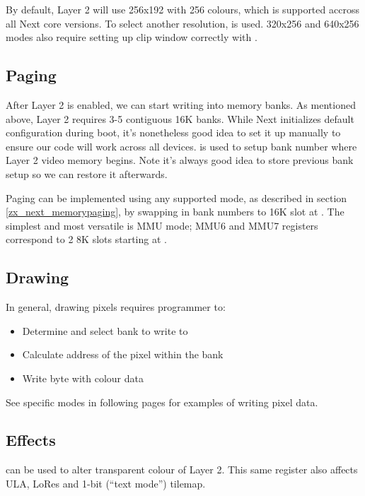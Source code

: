 By default, Layer 2 will use 256x192 with 256 colours, which is supported accross all Next core versions. To select another resolution,  is used. 320x256 and 640x256 modes also require setting up clip window correctly with .


\subsection{Paging}

After Layer 2 is enabled, we can start writing into memory banks. As mentioned above, Layer 2 requires 3-5 contiguous 16K banks. While Next initializes default configuration during boot, it's nonetheless good idea to set it up manually to ensure our code will work across all devices.  is used to setup bank number where Layer 2 video memory begins. Note it's always good idea to store previous bank setup so we can restore it afterwards.

Paging can be implemented using any supported mode, as described in section \ref{zx_next_memorypaging}, by swapping in bank numbers to 16K slot at . The simplest and most versatile is MMU mode; MMU6 and MMU7 registers correspond to 2 8K slots starting at .

\pagebreak
\subsection{Drawing}

In general, drawing pixels requires programmer to:

\begin{itemize}[topsep=1pt,itemsep=1pt]
    \item Determine and select bank to write to
    \item Calculate address of the pixel within the bank
    \item Write byte with colour data
\end{itemize}

See specific modes in following pages for examples of writing pixel data.


\subsection{Effects}

 can be used to alter transparent colour of Layer 2. This same register also affects ULA, LoRes and 1-bit (``text mode'') tilemap.

